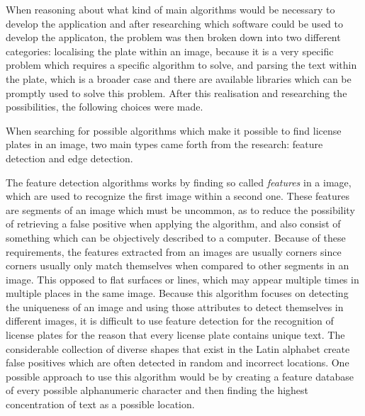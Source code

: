 
When reasoning about what kind of main algorithms would be necessary to develop the application and after researching which software could be used to develop the applicaton, the problem was then broken down into two different categories: localising the plate within an image, because it is a very specific problem which requires a specific algorithm to solve, and parsing the text within the plate, which is a broader case and there are available libraries which can be promptly used to solve this problem. After this realisation and researching the possibilities, the following choices were made.


When searching for possible algorithms which make it possible to find license plates in an image, two main types came forth from the research: feature detection and edge detection. 

The feature detection algorithms works by finding so called \emph{features} in a image, which are used to recognize the first image within a second one. These features are segments of an image which must be uncommon, as to reduce the possibility of retrieving a false positive when applying the algorithm, and also consist of something which can be objectively described to a computer. Because of these requirements, the features extracted from an images are usually corners since corners usually only match themselves when compared to other segments in an image. This opposed to flat surfaces or lines, which may appear multiple times in multiple places in the same image. Because this algorithm focuses on detecting the uniqueness of an image and using those attributes to detect themselves in different images, it is difficult to use feature detection for the recognition of license plates for the reason that every license plate contains unique text. The considerable collection of diverse shapes that exist in the Latin alphabet create false positives which are often detected in random and incorrect locations. One possible approach to use this algorithm would be by creating a feature database of every possible alphanumeric character and then finding the highest concentration of text as a possible location. 

